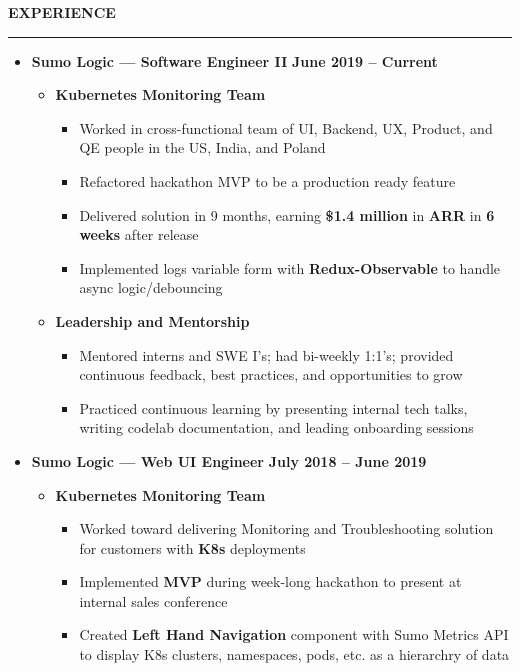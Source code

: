 \documentclass[10pt, oneside]{letter}
\newcommand{\linespaceshit} {
  \vspace{0.05in}
  \hrule
  \vspace{0.05in}
}
\newcommand{\textapprox}{\raisebox{0.5ex}{\texttildelow}}
\begin{document}
  \textbf{EXPERIENCE}
  \linespaceshit
  \begin{adjustwidth}{0.1in}{0pt}
    \begin{itemize}
      \item {
        \textbf{Sumo Logic --- Software Engineer II}
        \hfill
        \textbf{June 2019 -- Current}
      }
      \begin{itemize}
        \item \textbf{Kubernetes Monitoring Team}
        \begin{itemize}
          \item {
            Worked in cross-functional team of UI, Backend, UX, Product, and QE
            people in the US, India, and Poland
          }
          \item Refactored hackathon MVP to be a production ready feature
          \item {
            Delivered solution in 9 months, earning \textbf{\textapprox\$1.4
              million} in \textbf{ARR} in \textbf{6 weeks} after release
          }
          \item {
            Implemented logs variable form with \textbf{Redux-Observable} to
            handle async logic/debouncing
          }
        \end{itemize}

        \item \textbf{Leadership and Mentorship}
        \begin{itemize}
          \item {
            Mentored interns and SWE I's; had bi-weekly 1:1's; provided
            continuous feedback, best practices, and opportunities to grow
          }
          \item {
            Practiced continuous learning by presenting internal tech talks,
            writing codelab documentation, and leading onboarding sessions
          }
        \end{itemize}

      \end{itemize}

      \item {
        \textbf{Sumo Logic --- Web UI Engineer}
        \hfill
        \textbf{July 2018 -- June 2019}
      }
      \begin{itemize}
        \item \textbf{Kubernetes Monitoring Team}
        \begin{itemize}
          \item {
            Worked toward delivering Monitoring and Troubleshooting solution
            for customers with \textbf{K8s} deployments
          }
          \item {
            Implemented \textbf{MVP} during week-long hackathon to present at
            internal sales conference
          }
          \item {
            Created \textbf{Left Hand Navigation} component with Sumo Metrics
            API to display K8s clusters, namespaces, pods, etc. as a
            hierarchry of data
          }
        \end{itemize}


\end{itemize}
\end{itemize}
\end{adjustwidth}
\end{document}
